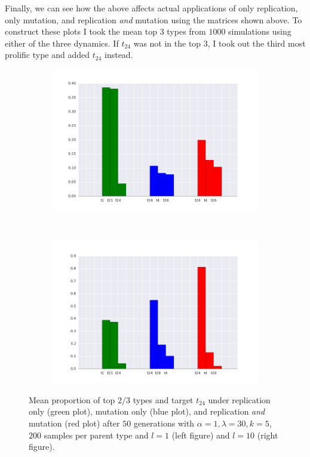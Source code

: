 \documentclass[a4paper]{article}
\begin{document}
\newpage

Finally, we can see how the above affects actual applications of only replication, only mutation, and replication \emph{and} mutation using the matrices shown above. To construct these plots I took the mean top $3$ types from $1000$ simulations using either of the three dynamics. If $t_{24}$ was not in the top $3$, I took out the third most prolific type and added $t_{24}$ instead. 

\begin{figure}[h!]
  \centering
  \begin{subfigure}[b]{0.45\textwidth}
    \includegraphics[scale=0.4]{../code-LOT-extension/plots/rmd-lam30-a1-k5-s200-l1-meTrue.png}
  \end{subfigure}
  ~
   \begin{subfigure}[b]{0.45\textwidth}
    \includegraphics[scale=0.4]{../code-LOT-extension/plots/rmd-lam30-a1-k5-s200-l10-meTrue.png}
  \end{subfigure}
  \caption{Mean proportion of top $2/3$ types and target $t_{24}$ under replication only (green plot), mutation only (blue plot), and replication {\em and} mutation (red plot) after $50$ generations with $\alpha = 1, \lambda = 30, k = 5$, $200$ samples per parent type and $l = 1$ (left figure) and $l = 10$ (right figure).}
  \label{fig:outcomes}
\end{figure}
\end{document}
